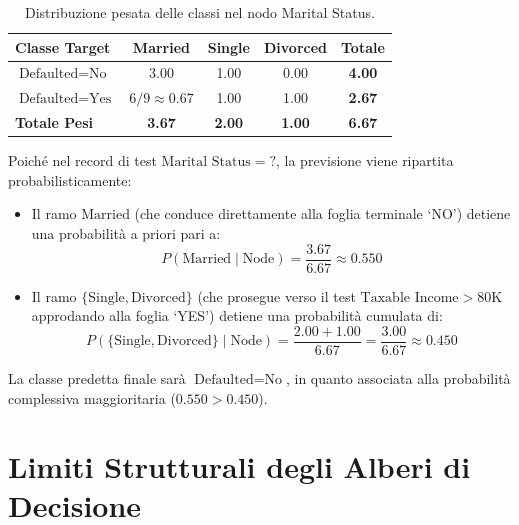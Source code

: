 \begin{table}[H]
\centering
\caption{Distribuzione pesata delle classi nel nodo Marital Status.}
\label{tab:dm-missing-test-distribution}
\vspace{2mm}
\begin{tabular}{lcccc}
\toprule
\textbf{Classe Target} & \textbf{Married} & \textbf{Single} & \textbf{Divorced} & \textbf{Totale} \\
\midrule
$\text{Defaulted}=\text{No}$ & 3.00 & 1.00 & 0.00 & \textbf{4.00} \\
$\text{Defaulted}=\text{Yes}$ & $6/9 \approx 0.67$ & 1.00 & 1.00 & \textbf{2.67} \\
\midrule
\textbf{Totale Pesi} & \textbf{3.67} & \textbf{2.00} & \textbf{1.00} & \textbf{6.67} \\
\bottomrule
\end{tabular}
\end{table}

Poiché nel record di test $\text{Marital Status} = ?$, la previsione viene ripartita probabilisticamente:
\begin{itemize}
    \item Il ramo $\text{Married}$ (che conduce direttamente alla foglia terminale `NO') detiene una probabilità a priori pari a:
    \begin{equation}
        P(\text{Married} \mid \text{Node}) = \frac{3.67}{6.67} \approx 0.550
    \end{equation}
    \item Il ramo $\{\text{Single}, \text{Divorced}\}$ (che prosegue verso il test $\text{Taxable Income} > 80\text{K}$ approdando alla foglia `YES') detiene una probabilità cumulata di:
    \begin{equation}
        P(\{\text{Single}, \text{Divorced}\} \mid \text{Node}) = \frac{2.00 + 1.00}{6.67} = \frac{3.00}{6.67} \approx 0.450
    \end{equation}
\end{itemize}
La classe predetta finale sarà $\text{Defaulted} = \text{No}$, in quanto associata alla probabilità complessiva maggioritaria ($0.550 > 0.450$).

\FloatBarrier
\section{Limiti Strutturali degli Alberi di Decisione}
\label{sec:dm-structural-limitations}

